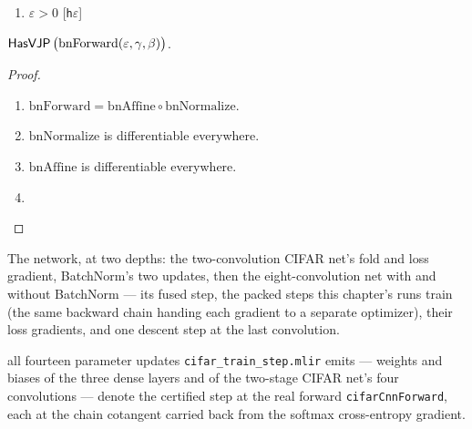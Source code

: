 \begin{theorem}
  \label{thm:bnHasVJP}
  \leanok
  \Assume{}
  \begin{enumerate}
    \item \(\varepsilon > 0\) \hfill[\texttt{h\(\varepsilon\)}]
  \end{enumerate}
  \Prove{} \(\mathsf{HasVJP}\, \bigl(\mathrm{bnForward}(\varepsilon, \gamma,
  \beta)\bigr)\).
\end{theorem}

\begin{proof}
\leanok
\begin{enumerate}
  \item \(\mathrm{bnForward} = \mathrm{bnAffine} \circ
    \mathrm{bnNormalize}\).
  \item \(\mathrm{bnNormalize}\) is differentiable everywhere.
  \item \(\mathrm{bnAffine}\) is differentiable everywhere.
  \item \Qed{}
\end{enumerate}
\end{proof}

The network, at two depths: the two-convolution CIFAR net's fold and loss
gradient, BatchNorm's two updates, then the eight-convolution net with and
without BatchNorm --- its fused step, the packed steps this chapter's runs
train (the same backward chain handing each gradient to a separate
optimizer), their loss gradients, and one descent step at the last
convolution.

\begin{theorem}
  \label{thm:cifar_fold}
  \leanok
  \Prove{} all fourteen parameter updates \texttt{cifar\_train\_step.mlir}
  emits --- weights and biases of the three dense layers and of the two-stage
  CIFAR net's four convolutions --- denote the certified step at the real
  forward \texttt{cifarCnnForward}, each at the chain cotangent carried back
  from the softmax cross-entropy gradient.
\end{theorem}


